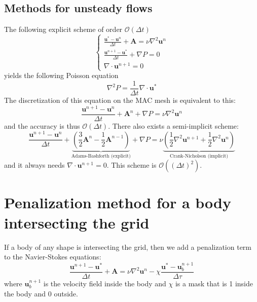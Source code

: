 \documentclass[12pt, openany]{report}
\theoremstyle{definition}
\begin{document}
\subsection{Methods for unsteady flows}
The following explicit scheme of order $\mathcal{O}(\Delta t)$ 
\begin{equation}
	\begin{cases}
		\frac{\boldsymbol{u}^*-\boldsymbol{u}^n}{\Delta t} + \boldsymbol{A} = \nu \nabla^2 \boldsymbol{u}^n\\
		\frac{\boldsymbol{u}^{n+1}-\boldsymbol{u}^*}{\Delta t} + \nabla P = 0 \\
		\nabla \cdot \boldsymbol{u}^{n+1} = 0
	\end{cases}
\end{equation}
yields the following Poisson equation 
\begin{equation}
	\nabla^2 P = \frac{1}{\Delta t} \nabla \cdot \boldsymbol{u}^*
\end{equation}
The discretization of this equation on the MAC mesh is equivalent to this:
\begin{equation}
	\frac{\boldsymbol{u}^{n+1} - \boldsymbol{u}^n}{\Delta t} + \boldsymbol{A}^n + \nabla P = \nu \nabla^2 \boldsymbol{u}^n
\end{equation}
and the accuracy is thus $\mathcal{O}(\Delta t)$. There also exists a semi-implicit scheme: 
\begin{equation}
	\frac{\boldsymbol{u}^{n+1}-\boldsymbol{u}^n}{\Delta t} + \underbrace{\left(\frac{3}{2}\boldsymbol{A}^n - \frac{1}{2}\boldsymbol{A}^{n-1}\right)}_{\text{Adams-Bashforth (explicit)}} + \nabla P = \nu \underbrace{\left(\frac{1}{2}\nabla^2 \boldsymbol{u}^{n+1} + \frac{1}{2}\nabla^2 \boldsymbol{u}^n\right)}_{\text{Crank-Nicholson (implicit)}}
\end{equation}
and it always needs $\nabla \cdot \boldsymbol{u}^{n+1}=0$. This scheme is $\mathcal{O}((\Delta t)^2)$. 
\section{Penalization method for a body intersecting the grid}
If a body of any shape is intersecting the grid, then we add a penalization term to the Navier-Stokes equations:
\begin{equation}\label{eq:penalize}
	\frac{\boldsymbol{u}^{n+1}-\boldsymbol{u}^*}{\Delta t} + \boldsymbol{A} = \nu \nabla^2 \boldsymbol{u}^n - \chi \frac{\boldsymbol{u}^*-\boldsymbol{u}_b^{n+1}}{\Delta \tau}
\end{equation}
where $\boldsymbol{u}_b^{n+1}$ is the velocity field inside the body and $\chi$ is a mask that is 1 inside the body and 0 outside. \\
\end{document}
